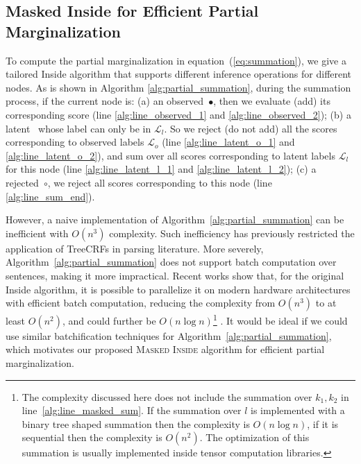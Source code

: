 \subsection{Masked Inside for Efficient Partial Marginalization}
\label{ssec:masked_inside}
To compute the partial marginalization in equation~(\ref{eq:summation}), we give a tailored Inside algorithm that supports different inference operations for different nodes.
As is shown in Algorithm \ref{alg:partial_summation}, during the summation process,
if the current node is:
(a) an observed~$\bullet$, then we evaluate (add) its corresponding score (line \ref{alg:line_observed_1} and \ref{alg:line_observed_2}); 
(b) a latent~\scalebox{0.8}{$\square$} whose label can only be in $\mathcal{L}_l$.
So we reject (do not add) all the scores corresponding to observed labels $\mathcal{L}_o$  (line \ref{alg:line_latent_o_1} and \ref{alg:line_latent_o_2}), and sum over all scores corresponding to latent labels $\mathcal{L}_l$ for this node (line \ref{alg:line_latent_l_1} and \ref{alg:line_latent_l_2}); 
(c) a rejected~$\circ$, we reject all scores corresponding to this node (line \ref{alg:line_sum_end}). 

However, a naive implementation of Algorithm~\ref{alg:partial_summation} can be inefficient with $O(n^3)$ complexity. 
Such inefficiency has previously restricted the application of TreeCRFs in parsing literature. 
More severely, Algorithm~\ref{alg:partial_summation} does not support batch computation over sentences, making it more impractical.
Recent works show that, for the original Inside algorithm, it is possible to parallelize it on modern hardware architectures with efficient batch computation, reducing the complexity from $O(n^3)$ to at least $O(n^2)$, and could further be $O(n\log n)$\footnote{
The complexity discussed here does not include the summation over $k_1, k_2$ in line~\ref{alg:line_masked_sum}. If the summation over $l$ is implemented with a binary tree shaped summation then the complexity is $O(n \log n)$, if it is sequential then the complexity is $O(n^2)$. The optimization of this summation is usually implemented inside tensor computation libraries.
}
\citep{Rush2020TorchStructDS, Zhang2020FastAA}. 
It would be ideal if we could use similar batchification techniques for Algorithm~\ref{alg:partial_summation}, which motivates our proposed \textsc{Masked Inside} algorithm for efficient partial marginalization. 







